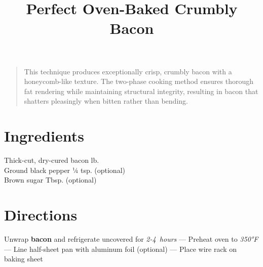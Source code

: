 \documentclass[11pt,letterpaper]{article}
\title{Perfect Oven-Baked Crumbly Bacon}
\author{}
\date{}
\begin{document}
\maketitle
\thispagestyle{empty}

\begin{quote}
\small
\begin{em}
This technique produces exceptionally crisp, crumbly bacon with a honeycomb-like texture. The two-phase cooking method ensures thorough fat rendering while maintaining structural integrity, resulting in bacon that shatters pleasingly when bitten rather than bending.
\end{em}
\end{quote}

\section*{Ingredients}
\setlength{\columnsep}{20pt}
\begin{multicols}{2}
\noindent
    Thick-cut, dry-cured bacon  lb. \\
    Ground black pepper \dotfill ¼ tsp. (optional) \\
    Brown sugar  Tbsp. (optional) \\
\end{multicols}

\section*{Directions}

\noindent
Unwrap \textbf{bacon} and refrigerate uncovered for \textit{2-4~hours} ---
Preheat oven to \textit{350°F} ---
Line half-sheet pan with aluminum foil (optional) ---
Place wire rack on baking sheet
\end{document}
